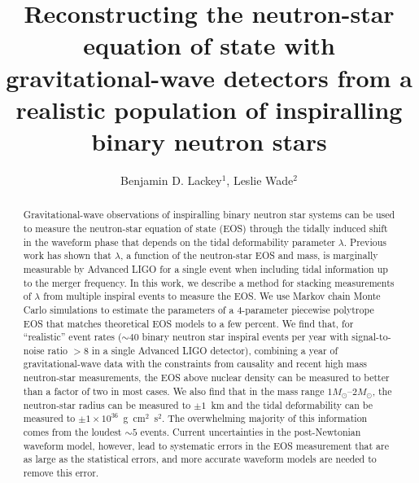 \documentclass[twocolumn,prd,amssymb,aps,nofootinbib,showpacs,epsf]{revtex4}
\begin{document}
\title{Reconstructing the neutron-star equation of state with gravitational-wave detectors from a realistic population of inspiralling binary neutron stars}

\author{Benjamin D. Lackey$^1$, Leslie Wade$^2$}


\begin{abstract}
Gravitational-wave observations of inspiralling binary neutron star systems can be used to measure the neutron-star equation of state (EOS) through the tidally induced shift in the waveform phase that depends on the tidal deformability parameter $\lambda$. Previous work has shown that $\lambda$, a function of the neutron-star EOS and mass, is marginally measurable by Advanced LIGO for a single event when including tidal information up to the merger frequency. In this work, we describe a method for stacking measurements of $\lambda$ from multiple inspiral events to measure the EOS. We use Markov chain Monte Carlo simulations to estimate the parameters of a 4-parameter piecewise polytrope EOS that matches theoretical EOS models to a few percent. We find that, for ``realistic'' event rates ($\sim 40$ binary neutron star inspiral events per year with signal-to-noise ratio $> 8$ in a single Advanced LIGO detector), combining a year of gravitational-wave data with the constraints from causality and recent high mass neutron-star measurements, the EOS above nuclear density can be measured to better than a factor of two in most cases. We also find that in the mass range $1M_\odot$--$2M_\odot$, the neutron-star radius can be measured to $\pm 1$~km and the tidal deformability can be measured to $\pm 1 \times 10^{36}$~g~cm$^2$~s$^2$. The overwhelming majority of this information comes from the loudest $\sim 5$ events. Current uncertainties in the post-Newtonian waveform model, however, lead to systematic errors in the EOS measurement that are as large as the statistical errors, and more accurate waveform models are needed to remove this error.
\end{abstract}


\maketitle
\end{document}
